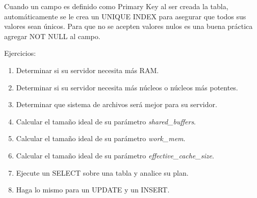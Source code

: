 Cuando un campo es definido como Primary Key al ser creada la tabla, automáticamente se le crea un UNIQUE INDEX para asegurar que todos sus valores sean únicos. Para que no se acepten valores nulos es una buena práctica agregar NOT NULL al campo.

\newpage

Ejercicios:\\

\begin{enumerate}
\item Determinar si su servidor necesita más RAM.
\item Determinar si su servidor necesita más núcleos o núcleos más potentes.
\item Determinar que sistema de archivos será mejor para su servidor.
\item Calcular el tamaño ideal de su parámetro \textit{shared\_buffers}.
\item Calcular el tamaño ideal de su parámetro \textit{work\_mem}.
\item Calcular el tamaño ideal de su parámetro \textit{effective\_cache\_size}.
\item Ejecute un SELECT sobre una tabla y analice su plan.
\item Haga lo mismo para un UPDATE y un INSERT.
\end{enumerate}

